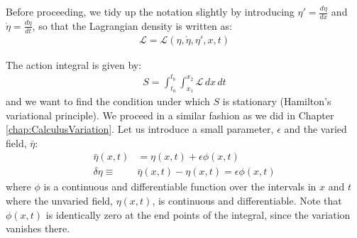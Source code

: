Before proceeding, we tidy up the notation slightly by introducing $\eta'=\frac{d\eta}{dx}$ and $\dot\eta=\frac{d\eta}{dt}$, so that the Lagrangian density is written as:
\begin{align}
\mathcal{L}=\mathcal{L}(\eta,\dot\eta,\eta',x,t)
\end{align}

The action integral is given by:
\begin{align}
S=\int_{t_a}^{t_b} \int_{x_1}^{x_2}\mathcal{L}\,dx\,dt
\end{align}
and we want to find the condition under which $S$ is stationary (Hamilton's variational principle). We proceed in a similar fashion as we did in Chapter \ref{chap:CalculusVariation}. Let us introduce a small parameter, $\epsilon$ and the varied field, $\bar\eta$:
\begin{align}
\bar\eta(x,t)&=\eta(x,t)+\epsilon\phi(x,t)\nonumber\\
\delta \eta \equiv&\bar\eta(x,t)-\eta(x,t) = \epsilon \phi(x,t)
\end{align}
where $\phi$ is a continuous and differentiable function over the intervals in $x$ and $t$ where the unvaried field, $\eta(x,t)$, is continuous and differentiable. Note that $\phi(x,t)$ is identically zero at the end points of the integral, since the variation vanishes there.

